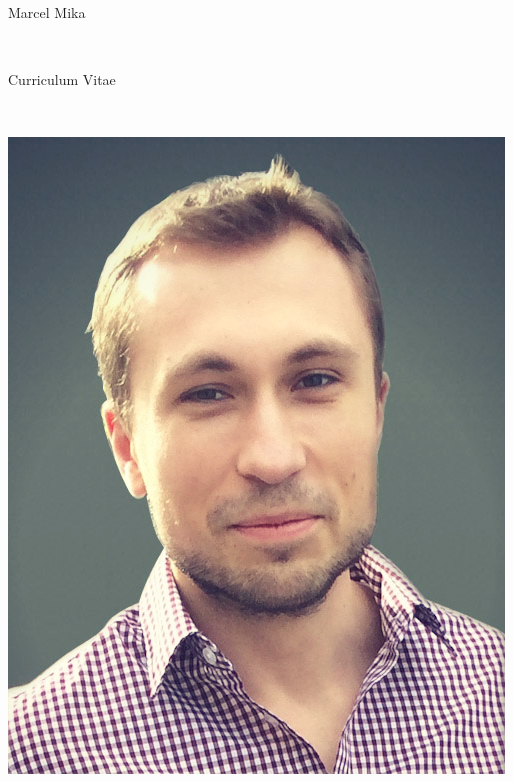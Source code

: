 \documentclass[10pt]{article} %
\begin{document}
\color{text1} %


\par\parindent 95pt {\Huge Marcel Mika }
{  \\[-7pt]\par}
\par\parindent 95pt {\large Curriculum Vitae}
{  \\[-59pt]\par}
\noindent	
\begin{minipage}[t]{0.5\textwidth}%
\vspace{0pt}%
\begin{minipage}[b]{0.30\textwidth} %
\includegraphics[width=\textwidth]{figures/profile.jpg}

\end{minipage}
\end{minipage}
\end{document}

